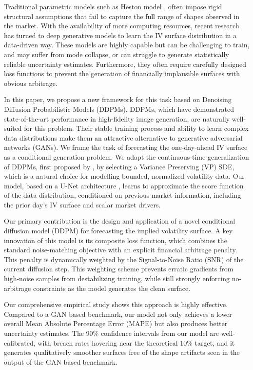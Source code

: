 \documentclass{article}
\begin{document}
Traditional parametric models such as Heston model \citep{Heston_1993}, often impose rigid structural assumptions that fail to capture the full range of shapes observed in the market. With the availability of more computing resources, recent research has turned to deep generative models to learn the IV surface distribution in a data-driven way. These models are highly capable but can be challenging to train, and may suffer from mode collapse, or can struggle to generate statistically reliable uncertainty estimates. Furthermore, they often require carefully designed loss functions to prevent the generation of financially implausible surfaces with obvious arbitrage.

In this paper, we propose a new framework for this task based on Denoising Diffusion Probabilistic Models (DDPMs). DDPMs, which have demonstrated state-of-the-art performance in high-fidelity image generation, are naturally well-suited for this problem. Their stable training process and ability to learn complex data distributions make them an attractive alternative to generative adversarial networks (GANs). We frame the task of forecasting the one-day-ahead IV surface as a conditional generation problem. We adapt the continuous-time generalization of DDPMs, first proposed by \citet{DBLP:journals/corr/abs-2011-13456}, by selecting a Variance Preserving (VP) SDE, which is a natural choice for modelling bounded, normalized volatility data. Our model, based on a U-Net architecture \citep{pmlr-v37-sohl-dickstein15}, learns to approximate the score function of the data distribution, conditioned on previous market information, including the prior day's IV surface and scalar market drivers.

Our primary contribution is the design and application of a novel conditional diffusion model (DDPM) for forecasting the implied volatility surface. A key innovation of this model is its composite loss function, which combines the standard noise-matching objective with an explicit financial arbitrage penalty. This penalty is dynamically weighted by the Signal-to-Noise Ratio (SNR) of the current diffusion step. This weighting scheme prevents erratic gradients from high-noise samples from destabilizing training, while still strongly enforcing no-arbitrage constraints as the model generates the clean surface.

Our comprehensive empirical study shows this approach is highly effective. Compared to a GAN based benchmark, our model not only achieves a lower overall Mean Absolute Percentage Error (MAPE) but also produces better uncertainty estimates. The 90\% confidence intervals from our model are well-calibrated, with breach rates hovering near the theoretical 10\% target, and it generates qualitatively smoother surfaces free of the shape artifacts seen in the output of the GAN based benchmark.
\end{document}
